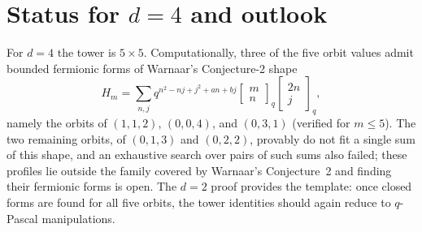 \documentclass[11pt]{article}
\theoremstyle{remark}
\newcommand{\qbin}[2]{\begin{bmatrix}#1\\#2\end{bmatrix}_q}
\begin{document}
\section{Status for $d=4$ and outlook}

For $d=4$ the tower is $5\times 5$. Computationally, three of the five
orbit values admit bounded fermionic forms of Warnaar's Conjecture-2 shape
\[
H_m=\sum_{n,j} q^{n^2-nj+j^2+an+bj}\qbin{m}{n}\begin{bmatrix}2n\\
j\end{bmatrix}_q,
\]
namely the orbits of $(1,1,2)$, $(0,0,4)$, and $(0,3,1)$ (verified for
$m\le 5$). The two remaining orbits, of $(0,1,3)$ and $(0,2,2)$, provably
do not fit a single sum of this shape, and an exhaustive search over pairs
of such sums also failed; these profiles lie outside the family covered by
Warnaar's Conjecture~2 and finding their fermionic forms is open. The
$d=2$ proof provides the template: once closed forms are found for all
five orbits, the tower identities should again reduce to $q$-Pascal
manipulations.
\end{document}
